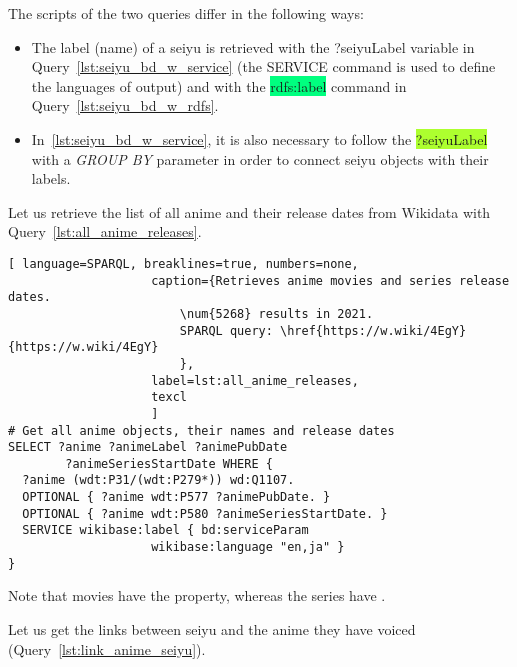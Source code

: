 The scripts of the two queries differ in the following ways:
\begin{itemize}
    \item{The label (name) of a seiyu is retrieved with the \colorbox{Apricot}{?seiyuLabel} variable in Query~\ref{lst:seiyu_bd_w_service} (the \colorbox{Apricot}{SERVICE} command is used to define the languages of output) and with the \colorbox{SpringGreen}{rdfs:label} command in Query~\ref{lst:seiyu_bd_w_rdfs}.}
    \item{In~\ref{lst:seiyu_bd_w_service}, it is also necessary to follow the \colorbox{GreenYellow}{?seiyuLabel} with a \emph{GROUP BY} parameter in order to connect seiyu objects with their labels.}
\end{itemize}


Let us retrieve the list of all anime and their release dates from Wikidata with Query~\ref{lst:all_anime_releases}.

\begin{lstlisting}[ language=SPARQL, breaklines=true, numbers=none,
                    caption={Retrieves anime movies and series release dates.
                        \num{5268} results in 2021.
                        SPARQL query: \href{https://w.wiki/4EgY}{https://w.wiki/4EgY}
                        },
                    label=lst:all_anime_releases,
                    texcl 
                    ]
# Get all anime objects, their names and release dates
SELECT ?anime ?animeLabel ?animePubDate
		?animeSeriesStartDate WHERE {
  ?anime (wdt:P31/(wdt:P279*)) wd:Q1107.
  OPTIONAL { ?anime wdt:P577 ?animePubDate. }
  OPTIONAL { ?anime wdt:P580 ?animeSeriesStartDate. }
  SERVICE wikibase:label { bd:serviceParam
					wikibase:language "en,ja" }
}
\end{lstlisting}%

Note that movies have the  property, whereas the series have .

Let us get the links between seiyu and the anime they have voiced (Query~\ref{lst:link_anime_seiyu}).

